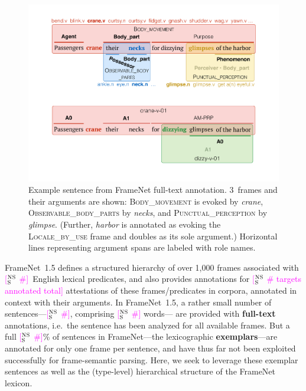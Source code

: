 \documentclass[11pt,a4paper]{article}
\newcommand{\ensuretext}[1]{#1}
\newcommand{\nssmarker}{\ensuretext{\textcolor{magenta}{\ensuremath{^{\textsc{NS}}_{\textsc{S}}}}}}
\newcommand{\arkcomment}[3]{\ensuretext{\textcolor{#3}{[#1 #2]}}}
\newcommand{\nss}[1]{\arkcomment{\nssmarker}{#1}{magenta}}
\newcommand{\fnf}[1]{\textsc{#1}} %
\begin{document}
\begin{figure}
\includegraphics[width=\columnwidth]{harbor-fn.pdf}
\caption{Example sentence from FrameNet full-text annotation. 
3~frames and their arguments are shown: 
\fnf{Body\_movement} is evoked by \textit{crane},
\fnf{Observable\_body\_parts} by \textit{necks}, 
and \fnf{Punctual\_perception} by \textit{glimpse}.
(Further, \textit{harbor} is annotated as evoking the \fnf{Locale\_by\_use} frame 
and doubles as its sole argument.) 
Horizontal lines representing argument spans 
are labeled with role names.}
\label{fig:harbor-fn}
\end{figure}

FrameNet~1.5 defines a structured hierarchy of over 1,000 frames associated with \nss{\#}~English lexical predicates, 
and also provides annotations for \nss{\# targets annotated total} attestations 
of these frames/predicates in corpora, annotated in context with their arguments. 
In FrameNet~1.5, a rather small number of sentences---\nss{\#}, comprising \nss{\#} words---%
are provided with \textbf{full-text} annotations, i.e.~the sentence 
has been analyzed for all available frames. 
But a full \nss{\#}\% of sentences in FrameNet---the lexicographic \textbf{exemplars}---are annotated for only one frame per sentence, 
and have thus far not been exploited successfully for frame-semantic parsing.
Here, we seek to leverage these exemplar sentences 
as well as the (type-level) hierarchical structure of the FrameNet lexicon. 
\end{document}
